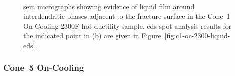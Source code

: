 \begin{figure}
\centering
{} \\
\caption[]{\Gls{sem} micrographs showing evidence of liquid film around interdendritic phases adjacent to the fracture surface in the Cone~1 On-Cooling 2300\textdegree{}F hot ductility sample. \Gls{eds} spot analysis results for the indicated point in (b) are given in Figure~\ref{fig:c1-oc-2300-liquid-eds}.}
\label{fig:c1-oc-2300-sem-liquid}
\end{figure}



\subsubsection{Cone~5 On-Cooling}